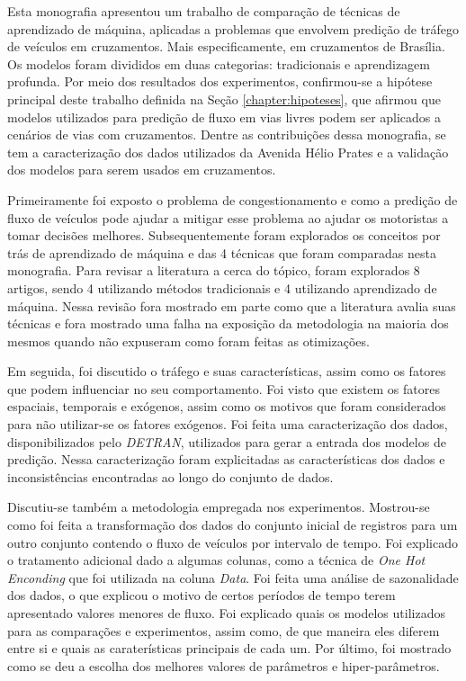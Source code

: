 Esta monografia apresentou um trabalho de comparação de técnicas de aprendizado de máquina, aplicadas a problemas que envolvem predição de tráfego de veículos em cruzamentos. Mais especificamente, em cruzamentos de Brasília. Os modelos foram divididos em duas categorias: tradicionais e aprendizagem profunda. Por meio dos resultados dos experimentos, confirmou-se a hipótese principal deste trabalho definida na Seção \ref{chapter:hipoteses}, que afirmou que modelos utilizados para predição de fluxo em vias livres podem ser aplicados a cenários de vias com cruzamentos. Dentre as contribuições dessa monografia, se tem a caracterização dos dados utilizados da Avenida Hélio Prates e a validação dos modelos para serem usados em cruzamentos.

Primeiramente foi exposto o problema de congestionamento e como a predição de fluxo de veículos pode ajudar a mitigar esse problema ao ajudar os motoristas a tomar decisões melhores. Subsequentemente foram explorados os conceitos por trás de aprendizado de máquina e das 4 técnicas que foram comparadas nesta monografia. Para revisar a literatura a cerca do tópico, foram explorados 8 artigos, sendo 4 utilizando métodos tradicionais e 4 utilizando aprendizado de máquina. Nessa revisão fora mostrado em parte como que a literatura avalia suas técnicas e fora mostrado uma falha na exposição da metodologia na maioria dos mesmos quando não expuseram como foram feitas as otimizações.  

Em seguida, foi discutido o tráfego e suas características, assim como os fatores que podem influenciar no seu comportamento. Foi visto que existem os fatores espaciais, temporais e exógenos, assim como os motivos que foram considerados para não utilizar-se os fatores exógenos. Foi feita uma caracterização dos dados, disponibilizados pelo \textit{\acrshort{DETRAN}}, utilizados para gerar a entrada dos modelos de predição. Nessa caracterização foram explicitadas as características dos dados e inconsistências encontradas ao longo do conjunto de dados.

Discutiu-se também a metodologia empregada nos experimentos. Mostrou-se como foi feita a transformação dos dados do conjunto inicial de registros para um outro conjunto contendo o fluxo de veículos por intervalo de tempo. Foi explicado o tratamento adicional dado a algumas colunas, como a técnica de \textit{One Hot Enconding} que foi utilizada na coluna \textit{Data}. Foi feita uma análise de sazonalidade dos dados, o que explicou o motivo de certos períodos de tempo terem apresentado valores menores de fluxo. Foi explicado quais os modelos utilizados para as comparações e experimentos, assim como, de que maneira eles diferem entre si e quais as caraterísticas principais de cada um. Por último, foi mostrado como se deu a escolha dos melhores valores de parâmetros e hiper-parâmetros.

